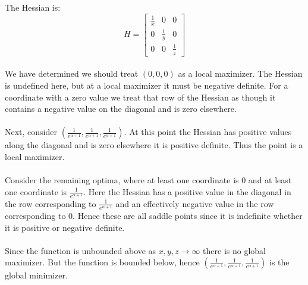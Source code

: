 \begin{enumerate}
\begin{enumerate}
			\textnormal{The Hessian is: }
			\[
				H =  \left[ \begin{array}{ccc}
						\frac{1}{x} & 0 & 0 \\
						0 & \frac{1}{y} & 0 \\
						0 & 0 & \frac{1}{z}
					       \end{array} 
					\right]
			\] \\
			\textnormal{We have determined we should treat \((0,0,0)\) as a local maximizer. The Hessian is undefined here, but at a local maximizer it must be negative definite. For a coordinate with a zero value we treat that row of the Hessian as though it contains a negative value on the diagonal and is zero elsewhere.} \\ \\
			\textnormal{Next, consider \((\frac{1}{e^{\alpha + 1}}, \frac{1}{e^{\alpha + 1}}, \frac{1}{e^{\alpha + 1}}) \).  At this point the Hessian has positive values along the diagonal and is zero elsewhere it is positive definite. Thus the point is a local maximizer.} \\ \\
			\textnormal{Consider the remaining optima, where at least one coordinate is 0 and at least one coordinate is \(\frac{1}{e^{\alpha + 1}}\).  Here the Hessian has a positive value in the diagonal in the row corresponding to \(\frac{1}{e^{\alpha + 1}}\) and an effectively negative value in the row corresponding to 0.  Hence these are all saddle points since it is indefinite whether it is positive or negative definite.} \\ \\
			\textnormal{Since the function is unbounded above as \(x,y,z \rightarrow \infty \) there is no global maximizer. But the function is bounded below, hence \((\frac{1}{e^{\alpha + 1}}, \frac{1}{e^{\alpha + 1}}, \frac{1}{e^{\alpha + 1}})\) is the global minimizer.}

		\end{enumerate}
\end{enumerate}





